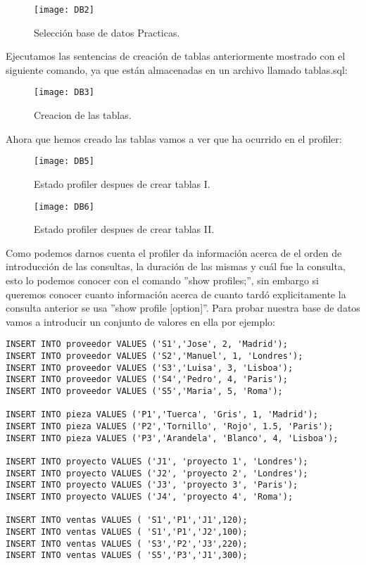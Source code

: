 \documentclass[a4paper, 10pt]{article} %
\begin{document}
\begin{figure}[H]
\centering 
\texttt{[image: DB2]} 
\caption{Selección base de datos Practicas.} 
\label{contexto:figura} 
\end{figure}
Ejecutamos las sentencias de creación de tablas anteriormente mostrado con el siguiente comando, ya que están almacenadas en un archivo llamado tablas.sql:
\begin{figure}[H]
\centering 
\texttt{[image: DB3]} 
\caption{Creacion de las tablas.} 
\label{contexto:figura} 
\end{figure}
Ahora que hemos creado las tablas vamos a ver que ha ocurrido en el profiler:
\begin{figure}[H]
\centering 
\texttt{[image: DB5]} 
\caption{Estado profiler despues de crear tablas I.} 
\label{contexto:figura} 
\end{figure}
\begin{figure}[H]
\centering 
\texttt{[image: DB6]} 
\caption{Estado profiler despues de crear tablas II.} 
\label{contexto:figura} 
\end{figure}
Como podemos darnos cuenta el profiler da información acerca de el orden de introducción de las consultas, la duración de las mismas y cuál fue la consulta, esto lo podemos conocer con el comando ''show profiles;'', sin embargo si queremos conocer cuanto información acerca de cuanto tardó explicitamente la consulta anterior se usa ''show profile [option]''. Para probar nuestra base de datos vamos a introducir un conjunto de valores en ella por ejemplo:
\begin{verbatim}
INSERT INTO proveedor VALUES ('S1','Jose', 2, 'Madrid');
INSERT INTO proveedor VALUES ('S2','Manuel', 1, 'Londres');
INSERT INTO proveedor VALUES ('S3','Luisa', 3, 'Lisboa');
INSERT INTO proveedor VALUES ('S4','Pedro', 4, 'Paris');
INSERT INTO proveedor VALUES ('S5','Maria', 5, 'Roma');

INSERT INTO pieza VALUES ('P1','Tuerca', 'Gris', 1, 'Madrid');
INSERT INTO pieza VALUES ('P2','Tornillo', 'Rojo', 1.5, 'Paris');
INSERT INTO pieza VALUES ('P3','Arandela', 'Blanco', 4, 'Lisboa');

INSERT INTO proyecto VALUES ('J1', 'proyecto 1', 'Londres');
INSERT INTO proyecto VALUES ('J2', 'proyecto 2', 'Londres');
INSERT INTO proyecto VALUES ('J3', 'proyecto 3', 'Paris');
INSERT INTO proyecto VALUES ('J4', 'proyecto 4', 'Roma');

INSERT INTO ventas VALUES ( 'S1','P1','J1',120);
INSERT INTO ventas VALUES ( 'S1','P1','J2',100);
INSERT INTO ventas VALUES ( 'S3','P2','J3',220);
INSERT INTO ventas VALUES ( 'S5','P3','J1',300);
\end{verbatim}
\end{document}
